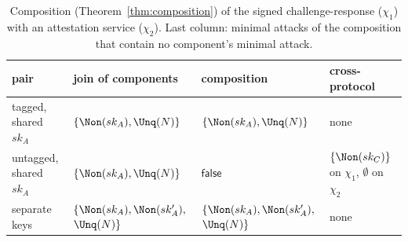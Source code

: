 \begin{table}[t]
\caption{Composition (Theorem~\ref{thm:composition}) of the signed challenge-response
($\chi_1$) with an attestation service ($\chi_2$). Last column: minimal attacks of the
composition that contain no component's minimal attack.}
\label{tab:composition}
\centering
\setlength{\tabcolsep}{3pt}
\footnotesize
\begin{tabular}{p{2.0cm} p{3.1cm} p{3.1cm} p{2.6cm}}
\toprule
pair & join of components & composition & cross-protocol\\
\midrule
tagged, shared $sk_A$ & $\{\Non(sk_A), \Unq(N)\}$ & $\{\Non(sk_A), \Unq(N)\}$ & none\\
untagged, shared $sk_A$ & $\{\Non(sk_A), \Unq(N)\}$ & $\mathsf{false}$ & $\{\Non(sk_C)\}$ on $\chi_1$, $\emptyset$ on $\chi_2$\\
separate keys & $\{\Non(sk_A), \Non(sk'_A),$ $\Unq(N)\}$ & $\{\Non(sk_A), \Non(sk'_A),$ $\Unq(N)\}$ & none\\
\bottomrule
\end{tabular}
\end{table}
